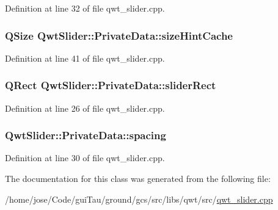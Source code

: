 Definition at line 32 of file qwt\-\_\-slider.\-cpp.

\hypertarget{class_qwt_slider_1_1_private_data_a2bd8a98b114d417a22d76a21626fd0fb}{
\subsubsection[{size\-Hint\-Cache}]{\setlength{\rightskip}{0pt plus 5cm}Q\-Size Qwt\-Slider\-::\-Private\-Data\-::size\-Hint\-Cache\hspace{0.3cm}{\ttfamily [mutable]}}}\label{class_qwt_slider_1_1_private_data_a2bd8a98b114d417a22d76a21626fd0fb}


Definition at line 41 of file qwt\-\_\-slider.\-cpp.

\hypertarget{class_qwt_slider_1_1_private_data_a063cc546cd8499c3ca49220a8a53f5e6}{
\subsubsection[{slider\-Rect}]{\setlength{\rightskip}{0pt plus 5cm}Q\-Rect Qwt\-Slider\-::\-Private\-Data\-::slider\-Rect}}\label{class_qwt_slider_1_1_private_data_a063cc546cd8499c3ca49220a8a53f5e6}


Definition at line 26 of file qwt\-\_\-slider.\-cpp.

\hypertarget{class_qwt_slider_1_1_private_data_ae463e78966bb2344826596fc6353c3a3}{
\subsubsection[{spacing}]{ Qwt\-Slider\-::\-Private\-Data\-::spacing}}\label{class_qwt_slider_1_1_private_data_ae463e78966bb2344826596fc6353c3a3}


Definition at line 30 of file qwt\-\_\-slider.\-cpp.



The documentation for this class was generated from the following file\-:\begin{DoxyCompactItemize}
\item 
/home/jose/\-Code/gui\-Tau/ground/gcs/src/libs/qwt/src/\hyperlink{qwt__slider_8cpp}{qwt\-\_\-slider.\-cpp}\end{DoxyCompactItemize}
